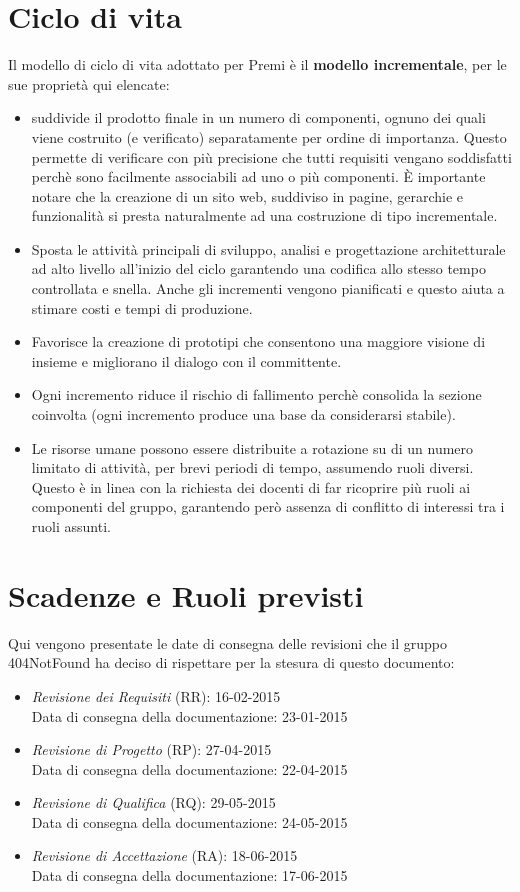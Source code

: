 \newpage
\section{Ciclo di vita}
Il modello di ciclo di vita adottato per Premi è il \textbf{modello incrementale}, per le sue proprietà qui elencate:

\begin{itemize}
	\item suddivide il prodotto finale in un numero di componenti, ognuno dei quali viene costruito (e verificato) separatamente per ordine di importanza. Questo permette di verificare con più precisione che tutti requisiti vengano soddisfatti perchè sono facilmente associabili ad uno o più componenti. È importante notare che la creazione di un sito web, suddiviso in pagine, gerarchie e funzionalità si presta naturalmente ad una costruzione di tipo incrementale.
	\item Sposta le attività principali di sviluppo, analisi e progettazione architetturale ad alto livello all'inizio del ciclo garantendo una codifica allo stesso tempo controllata e snella. Anche gli incrementi vengono pianificati e questo aiuta a stimare costi e tempi di produzione.
	\item Favorisce la creazione di prototipi che consentono una maggiore visione di insieme e migliorano il dialogo con il committente.
	\item Ogni incremento riduce il rischio di fallimento perchè consolida la sezione coinvolta (ogni incremento produce una base da considerarsi stabile).
	\item Le risorse umane possono essere distribuite a rotazione su di un numero limitato di attività, per brevi periodi di tempo, assumendo ruoli diversi. Questo è in linea con la richiesta dei docenti di far ricoprire più ruoli ai componenti del gruppo, garantendo però assenza di conflitto di interessi tra i ruoli assunti.
\end{itemize}	

\section{Scadenze e Ruoli previsti}
Qui vengono presentate le date di consegna delle revisioni che il gruppo 404NotFound ha deciso di rispettare per la stesura di questo documento:

\begin{itemize}
	\item \textit{Revisione dei Requisiti} (RR): 16-02-2015 \\
	Data di consegna della documentazione: 23-01-2015
	\item \textit{Revisione di Progetto} (RP): 27-04-2015 \\
	Data di consegna della documentazione: 22-04-2015
	\item \textit{Revisione di Qualifica} (RQ): 29-05-2015 \\
	Data di consegna della documentazione: 24-05-2015
	\item \textit{Revisione di Accettazione} (RA): 18-06-2015 \\
	Data di consegna della documentazione: 17-06-2015
\end{itemize}

